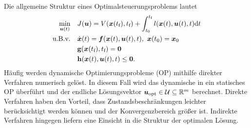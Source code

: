 %
%
%
%
%
%
%
%
%
%
%
%

Die allgemeine Struktur eines Optimalsteuerungsproblems lautet
%
\begin{equation*} \begin{aligned}
		\min\limits_{\boldsymbol{u}(t)} \ \ \ & J(\boldsymbol{u})=V(\boldsymbol{x}(t_\text{f}),t_\text{f}) + \int_{t_0}^{t_\text{f}}l(\boldsymbol{x}(t),\boldsymbol{u}(t),t)\text{d}t \\
		\text{u.B.v.} \ \ \ & \dot{\boldsymbol{x}}(t)=\boldsymbol{f}(\boldsymbol{x}(t),\boldsymbol{u}(t),t), \ \boldsymbol{x}(t_0)=\boldsymbol{x}_0\\ 
		& \mathbf{g}(\boldsymbol{x}(t_\text{f}),t_\text{f}) = \boldsymbol{0} \\
		& \mathbf{h}(\boldsymbol{x}(t),\boldsymbol{u}(t),t) \leq \boldsymbol{0}.
\end{aligned} \end{equation*}
%
Häufig werden dynamische Optimierungsprobleme (OP) mithilfe direkter Verfahren numerisch gelöst. 
In diesem Fall wird das dynamische in ein statisches OP überführt und der endliche Lösungsvektor $\boldsymbol{u}_\text{opt} \in \mathcal{U} \subseteq \mathbb{R}^m$ berechnet. 
Direkte Verfahren haben den Vorteil, dass Zustandsbeschränkungen leichter berücksichtigt werden können und der Konvergenzbereich größer ist. 
Indirekte Verfahren hingegen liefern eine Einsicht in die Struktur der optimalen Lösung.

